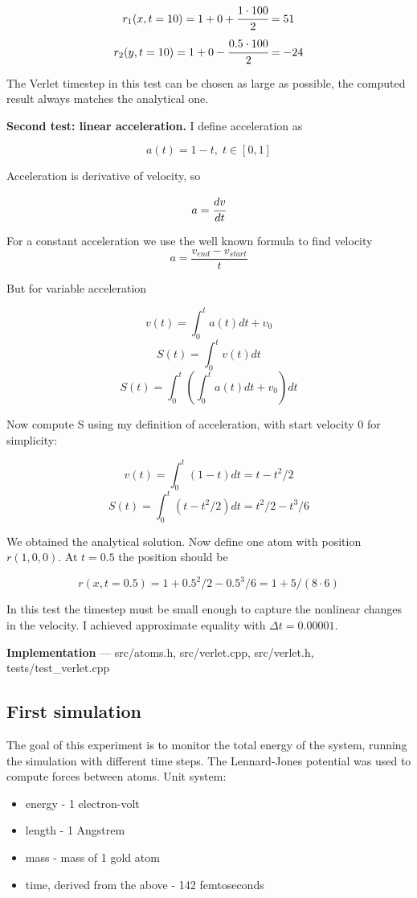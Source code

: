 \documentclass[12pt,a4paper]{article}
\begin{document}
\[ r_1(x, t=10) = 1 + 0 + \cfrac{1 \cdot 100}{2} = 51 \]
\[ r_2(y, t=10) = 1 + 0 - \cfrac{0.5 \cdot 100}{2} = -24 \]

The Verlet timestep in this test can be chosen as large as possible, the computed result always matches the analytical one.

{\bf Second test: linear acceleration.} I define acceleration as

\[ a(t) = 1 - t,\; t \in [0, 1] \]

Acceleration is derivative of velocity, so

\[ a = \cfrac{dv}{dt} \]

For a constant acceleration we use the well known formula to find velocity \[ a = \frac{v_{end}-v_{start}}{t} \]

But for variable acceleration

\[ v(t) = \int_0^t a(t) dt + v_0 \]
\[ S(t) = \int_0^t v(t) dt \]
\[ S(t) = \int_0^t \left( \int_0^t a(t) dt + v_0 \right) dt\]

Now compute S using my definition of acceleration, with start velocity 0 for simplicity:

\[ v(t) = \int_0^t (1-t) dt = t - t^2 / 2\]
\[ S(t) = \int_0^t (t - t^2/2) dt = t^2/2 - t^3/6 \]

We obtained the analytical solution. Now define one atom with position $r(1, 0, 0)$. At $t=0.5$ the position should be

\[ r(x, t=0.5) = 1 + 0.5^2/2 - 0.5^3/6 = 1 + 5/(8 \cdot 6)\]

In this test the timestep must be small enough to capture the nonlinear changes in the velocity. I achieved approximate equality with $\Delta t = 0.00001$.

{\bf Implementation} --- src/atoms.h, src/verlet.cpp, src/verlet.h, tests/test\_verlet.cpp

\subsection*{First simulation}

The goal of this experiment is to monitor the total energy of the system, running the simulation with different time steps. The Lennard-Jones potential was used to compute forces between atoms. Unit system:

\begin{itemize}
	\item energy - 1 electron-volt
	\item length - 1 Angstrem
	\item mass - mass of 1 gold atom 
	\item time, derived from the above - 142 femtoseconds
\end{itemize}
\end{document}
